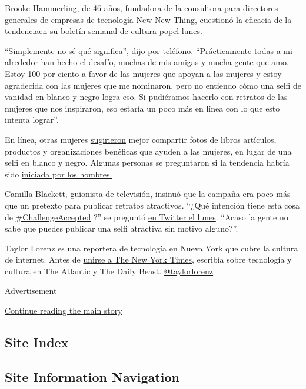 Brooke Hammerling, de 46 años, fundadora de la consultora para
directores generales de empresas de tecnología New New Thing, cuestionó
la eficacia de la
tendencia\href{https://medium.com/popculturemondays/pop-culture-mondays-7-20-20-3d2276f3c16}{en
su boletín semanal de cultura pop}el lunes.

``Simplemente no sé qué significa'', dijo por teléfono. ``Prácticamente
todas a mi alrededor han hecho el desafío, muchas de mis amigas y mucha
gente que amo. Estoy 100 por ciento a favor de las mujeres que apoyan a
las mujeres y estoy agradecida con las mujeres que me nominaron, pero no
entiendo cómo una selfi de vanidad en blanco y negro logra eso. Si
pudiéramos hacerlo con retratos de las mujeres que nos inspiraron, eso
estaría un poco más en línea con lo que esto intenta lograr''.

En línea, otras mujeres
\href{https://twitter.com/itsbooyeah/status/1287807365614534661}{sugirieron}
mejor compartir fotos de libros artículos, productos y organizaciones
benéficas que ayuden a las mujeres, en lugar de una selfi en blanco y
negro. Algunas personas se preguntaron si la tendencia habría sido
\href{https://twitter.com/wolfiecomedy/status/1287813475096387584}{iniciada
por los hombres.}

Camilla Blackett, guionista de televisión, insinuó que la campaña era
poco más que un pretexto para publicar retratos atractivos. ``¿Qué
intención tiene esta cosa de
\href{https://twitter.com/hashtag/ChallengeAccepted?src=hashtag_click}{\#ChallengeAccepted}
?'' se preguntó
\href{https://twitter.com/camillard/status/1287768130140246022}{en
Twitter el lunes}. ``Acaso la gente no sabe que puedes publicar una
selfi atractiva sin motivo alguno?''.

Taylor Lorenz es una reportera de tecnología en Nueva York que cubre la
cultura de internet. Antes de
\href{https://www.nytco.com/press/taylor-lorenz-to-join-styles/}{unirse
a The New York Times}, escribía sobre tecnología y cultura en The
Atlantic y The Daily Beast.
\href{https://twitter.com/taylorlorenz}{@taylorlorenz}

Advertisement

\protect\hyperlink{after-bottom}{Continue reading the main story}

\hypertarget{site-index}{%
\subsection{Site Index}\label{site-index}}

\hypertarget{site-information-navigation}{%
\subsection{Site Information
Navigation}\label{site-information-navigation}}

